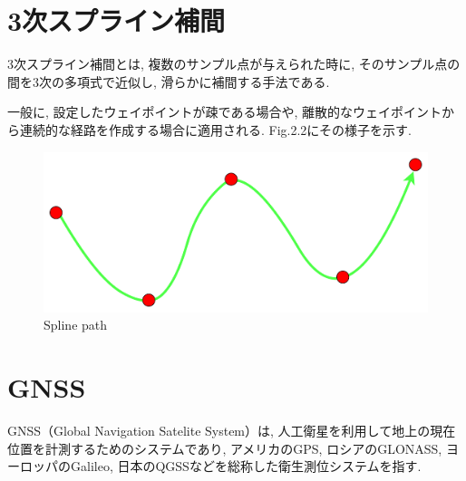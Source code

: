 

\section{3次スプライン補間}
3次スプライン補間とは, 複数のサンプル点が与えられた時に, そのサンプル点の間を3次の多項式で近似し, 滑らかに補間する手法である.

一般に, 設定したウェイポイントが疎である場合や, 離散的なウェイポイントから連続的な経路を作成する場合に適用される.
Fig.2.2にその様子を示す.

\begin{figure}[H]
     \centering
    \includegraphics[keepaspectratio, scale=0.5]
         {images/splinepath.png}
    \caption{Spline path}
    \label{fig:purepursuit}
\end{figure}

\section{GNSS}
GNSS（Global Navigation Satelite System）は, 
人工衛星を利用して地上の現在位置を計測するためのシステムであり, 
アメリカのGPS, ロシアのGLONASS, ヨーロッパのGalileo, 日本のQGSSなどを総称した衛生測位システムを指す.

